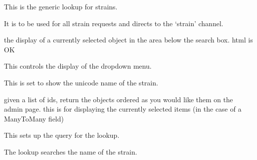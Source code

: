 \documentclass[letterpaper,10pt,english]{sphinxmanual}
\begin{document}

\begin{fulllineitems}
\label{api:experimentdb.reagents.lookups.StrainLookup}
This is the generic lookup for strains.

It is to be used for all strain requests and directs to the `strain' channel.

\begin{fulllineitems}
\label{api:experimentdb.reagents.lookups.StrainLookup.format_item}
the display of a currently selected object in the area below the search box. html is OK

\end{fulllineitems}


\begin{fulllineitems}
\label{api:experimentdb.reagents.lookups.StrainLookup.format_result}
This controls the display of the dropdown menu.

This is set to show the unicode name of the strain.

\end{fulllineitems}


\begin{fulllineitems}
\label{api:experimentdb.reagents.lookups.StrainLookup.get_objects}
given a list of ids, return the objects ordered as you would like them on the admin page.
this is for displaying the currently selected items (in the case of a ManyToMany field)

\end{fulllineitems}


\begin{fulllineitems}
\label{api:experimentdb.reagents.lookups.StrainLookup.get_query}
This sets up the query for the lookup.

The lookup searches the name of the strain.

\end{fulllineitems}


\end{fulllineitems}
\end{document}

